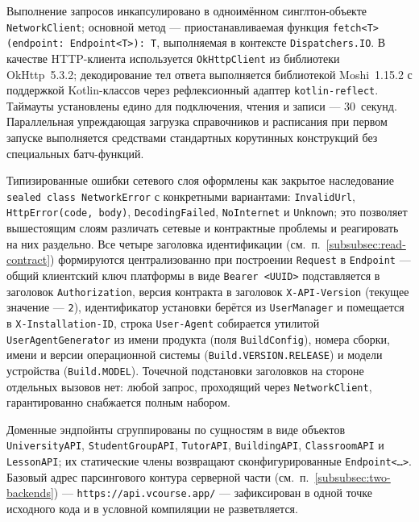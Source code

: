 Выполнение запросов инкапсулировано в одноимённом синглтон-объекте \texttt{NetworkClient}; основной метод --- приостанавливаемая функция \texttt{fetch<T>(\allowbreak endpoint:\,\allowbreak Endpoint<T>):\,T}, выполняемая в контексте \texttt{Dispatchers.\allowbreak IO}. В качестве HTTP-клиента используется \texttt{OkHttpClient} из библиотеки OkHttp~5.3.2; декодирование тел ответа выполняется библиотекой Moshi~1.15.2 с поддержкой Kotlin-классов через рефлексионный адаптер \texttt{kotlin-\allowbreak reflect}. Таймауты установлены едино для подключения, чтения и записи --- 30~секунд. Параллельная упреждающая загрузка справочников и расписания при первом запуске выполняется средствами стандартных корутинных конструкций без специальных батч-функций.

Типизированные ошибки сетевого слоя оформлены как закрытое наследование \texttt{sealed class NetworkError} с конкретными вариантами: \texttt{InvalidUrl}, \texttt{HttpError(code,\,body)}, \texttt{DecodingFailed}, \texttt{NoInternet} и \texttt{Unknown}; это позволяет вышестоящим слоям различать сетевые и контрактные проблемы и реагировать на них раздельно. Все четыре заголовка идентификации (см.~п.~\ref{subsubsec:read-contract}) формируются централизованно при построении \texttt{Request} в \texttt{Endpoint} --- общий клиентский ключ платформы в виде \texttt{Bearer <UUID>} подставляется в заголовок \texttt{Authorization}, версия контракта в заголовок \texttt{X-API-Version} (текущее значение --- \texttt{2}), идентификатор установки берётся из \texttt{UserManager} и помещается в \texttt{X-Installation-ID}, строка \texttt{User-Agent} собирается утилитой \texttt{UserAgentGenerator} из имени продукта (поля \texttt{BuildConfig}), номера сборки, имени и версии операционной системы (\texttt{Build.\allowbreak VERSION.\allowbreak RELEASE}) и модели устройства (\texttt{Build.\allowbreak MODEL}). Точечной подстановки заголовков на стороне отдельных вызовов нет: любой запрос, проходящий через \texttt{NetworkClient}, гарантированно снабжается полным набором.

Доменные эндпойнты сгруппированы по сущностям в виде объектов \texttt{UniversityAPI}, \texttt{StudentGroupAPI}, \texttt{TutorAPI}, \texttt{BuildingAPI}, \texttt{ClassroomAPI} и \texttt{LessonAPI}; их статические члены возвращают сконфигурированные \texttt{Endpoint<\dots>}. Базовый адрес парсингового контура серверной части (см.~п.~\ref{subsubsec:two-backends}) --- \texttt{https://\allowbreak api.\allowbreak vcourse.\allowbreak app/} --- зафиксирован в одной точке исходного кода и в условной компиляции не разветвляется.

